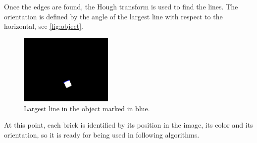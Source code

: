 Once the edges are found, the Hough transform is used to find the lines. The orientation is defined by the angle of the largest line with respect to the horizontal, see \autoref{fig:object}.

\begin{figure}[H]
    \includegraphics[width=0.4\textwidth]{figures/object.png}
    \caption{Largest line in the object marked in blue.}
    \label{fig:object}
\end{figure}

At this point, each brick is identified by its position in the image, its color and its orientation, so it is ready for being used in following algorithms.
